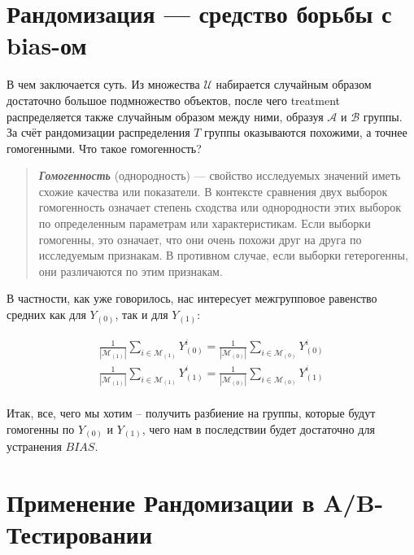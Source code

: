     \section*{Рандомизация --- средство борьбы с bias-ом}


        В чем заключается суть.
        Из множества $\mathcal{U}$ набирается случайным образом достаточно большое подмножество объектов, после чего treatment распределяется также случайным образом между ними, образуя $\mathcal{A}$ и $\mathcal{B}$ группы.
        За счёт рандомизации распределения $T$ группы оказываются похожими, а точнее гомогенными.
        Что такое гомогенность?

        \begin{quote}
            \textbf{\textit{Гомогенность}} (однородность) --- свойство исследуемых значений иметь схожие качества или показатели.
            В контексте сравнения двух выборок гомогенность означает степень сходства или однородности этих выборок по определенным параметрам или характеристикам.
            Если выборки гомогенны, это означает, что они очень похожи друг на друга по исследуемым признакам.
            В противном случае, если выборки гетерогенны, они различаются по этим признакам.
        \end{quote}

        В частности, как уже говорилось, нас интересует межгрупповое равенство средних как для $Y_{(0)}$, так и для $Y_{(1)}$:

        \begin{gather*}
            \frac{1}{|\mathcal{M}_{(1)}|} \displaystyle\sum_{i\in\mathcal{M}_{(1)}}
            Y^i_{(0)} =
            \frac{1}{|\mathcal{M}_{(0)}|} \displaystyle\sum_{i\in\mathcal{M}_{(0)}}
            Y^i_{(0)}\\
            \frac{1}{|\mathcal{M}_{(1)}|} \displaystyle\sum_{i\in\mathcal{M}_{(1)}}
            Y^i_{(1)} =
            \frac{1}{|\mathcal{M}_{(0)}|} \displaystyle\sum_{i\in\mathcal{M}_{(0)}}
            Y^i_{(1)}\\
        \end{gather*}


        Итак, все, чего мы хотим -- получить разбиение на группы, которые будут гомогенны по $Y_{(0)}$ и $Y_{(1)}$, чего нам в последствии будет достаточно для устранения $BIAS$.


    \section{Применение Рандомизации в A/B-Тестировании}

